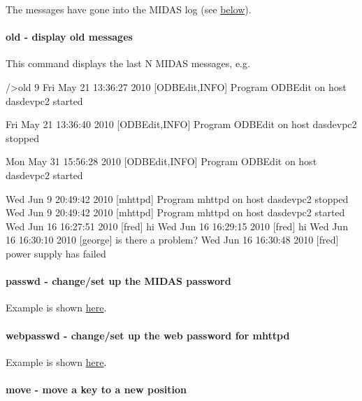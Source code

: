 The messages have gone into the MIDAS log (see \hyperlink{RC_odbedit_examples_RC_odbedit_old}{below}).



\hypertarget{RC_odbedit_examples_RC_odbedit_old}{}\paragraph{old -\/ display old messages}\label{RC_odbedit_examples_RC_odbedit_old}
This command displays the last N MIDAS messages, e.g. 
\begin{DoxyCode}
/>old 9
Fri May 21 13:36:27 2010 [ODBEdit,INFO] Program ODBEdit on host dasdevpc2 started
      
Fri May 21 13:36:40 2010 [ODBEdit,INFO] Program ODBEdit on host dasdevpc2 stopped
      
Mon May 31 15:56:28 2010 [ODBEdit,INFO] Program ODBEdit on host dasdevpc2 started
      
Wed Jun  9 20:49:42 2010 [mhttpd] Program mhttpd on host dasdevpc2 stopped
Wed Jun  9 20:49:42 2010 [mhttpd] Program mhttpd on host dasdevpc2 started
Wed Jun 16 16:27:51 2010 [fred] hi
Wed Jun 16 16:29:15 2010 [fred] hi
Wed Jun 16 16:30:10 2010 [george] is there a problem?
Wed Jun 16 16:30:48 2010 [fred] power supply has failed
\end{DoxyCode}




\hypertarget{RC_odbedit_examples_RC_odbedit_passwd}{}\paragraph{passwd -\/ change/set up the MIDAS password}\label{RC_odbedit_examples_RC_odbedit_passwd}
Example is shown \hyperlink{RC_customize_ODB_RC_Setup_Security}{here}.



\hypertarget{RC_odbedit_examples_RC_odbedit_webpasswd}{}\paragraph{webpasswd -\/ change/set up the web password for mhttpd}\label{RC_odbedit_examples_RC_odbedit_webpasswd}
Example is shown \hyperlink{RC_customize_ODB_RC_Setup_Web_Security}{here}.



\hypertarget{RC_odbedit_examples_RC_odbedit_move}{}\paragraph{move -\/ move a key to a new position}\label{RC_odbedit_examples_RC_odbedit_move}

